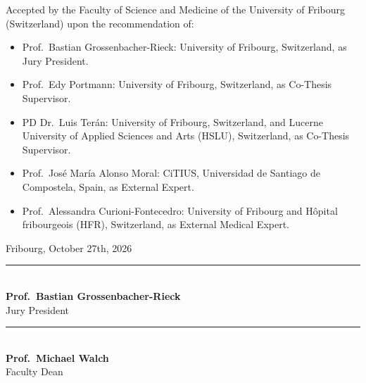 

\thispagestyle{empty}
\begin{flushleft}

\vspace*{0.06\textheight}

\noindent
Accepted by the Faculty of Science and Medicine of the University of
Fribourg (Switzerland) upon the recommendation of:

\medskip
\begin{itemize}
  \setlength{\itemsep}{0.25em}
  \setlength{\parskip}{0pt}

  \item Prof.\ Bastian Grossenbacher-Rieck: University of Fribourg, Switzerland, as Jury President.

  \item Prof.\ Edy Portmann: University of Fribourg, Switzerland,
        as Co-Thesis Supervisor.

  \item PD Dr.\ Luis Ter\'an: University of Fribourg, Switzerland, and
        Lucerne University of Applied Sciences and Arts (HSLU),
        Switzerland, as Co-Thesis Supervisor.

  \item Prof.\ Jos\'e Mar\'ia Alonso Moral: CiTIUS, Universidad de
        Santiago de Compostela, Spain, as External Expert.

  \item Prof.\ Alessandra Curioni-Fontecedro: University of Fribourg
        and H\^opital fribourgeois (HFR), Switzerland, as
        External Medical Expert.
\end{itemize}

\medskip
Fribourg, October 27th, 2026

\vspace{0.12\textheight}

\noindent
\begin{minipage}[t]{0.44\textwidth}
  \centering
  \rule{0.85\textwidth}{0.4pt}\\[0.3em]
  \textbf{Prof.\ Bastian Grossenbacher-Rieck}\\
  Jury President
\end{minipage}\hfill
\begin{minipage}[t]{0.44\textwidth}
  \centering
  \rule{0.85\textwidth}{0.4pt}\\[0.3em]
  \textbf{Prof.\ Michael Walch}\\
  Faculty Dean
\end{minipage}


\end{flushleft}
